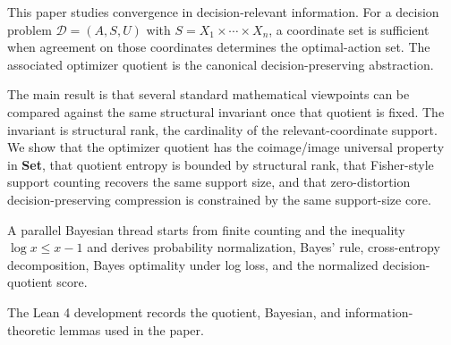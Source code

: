 This paper studies convergence in decision-relevant information. For a decision problem $\mathcal{D}=(A,S,U)$ with $S=X_1 \times \cdots \times X_n$, a coordinate set is sufficient when agreement on those coordinates determines the optimal-action set. The associated optimizer quotient is the canonical decision-preserving abstraction.

The main result is that several standard mathematical viewpoints can be compared against the same structural invariant once that quotient is fixed. The invariant is structural rank, the cardinality of the relevant-coordinate support. We show that the optimizer quotient has the coimage/image universal property in \textbf{Set}, that quotient entropy is bounded by structural rank, that Fisher-style support counting recovers the same support size, and that zero-distortion decision-preserving compression is constrained by the same support-size core.

A parallel Bayesian thread starts from finite counting and the inequality $\log x \le x - 1$ and derives probability normalization, Bayes' rule, cross-entropy decomposition, Bayes optimality under log loss, and the normalized decision-quotient score.

The Lean 4 development records the quotient, Bayesian, and information-theoretic lemmas used in the paper.
